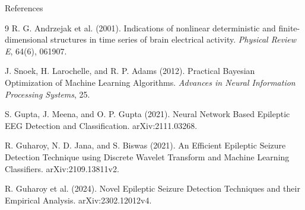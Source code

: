 \documentclass{beamer}
\begin{document}
\begin{frame}{References}
  \scriptsize
  \begin{thebibliography}{9}
    R. G. Andrzejak et al. (2001).
    \newblock Indications of nonlinear deterministic and finite-dimensional structures in time series of brain electrical activity.
    \newblock \emph{Physical Review E}, 64(6), 061907.

    J. Snoek, H. Larochelle, and R. P. Adams (2012).
    \newblock Practical Bayesian Optimization of Machine Learning Algorithms.
    \newblock \emph{Advances in Neural Information Processing Systems}, 25.

    S. Gupta, J. Meena, and O. P. Gupta (2021).
    \newblock Neural Network Based Epileptic EEG Detection and Classification.
    \newblock arXiv:2111.03268.

    R. Guharoy, N. D. Jana, and S. Biswas (2021).
    \newblock An Efficient Epileptic Seizure Detection Technique using Discrete Wavelet Transform and Machine Learning Classifiers.
    \newblock arXiv:2109.13811v2.

    R. Guharoy et al. (2024).
    \newblock Novel Epileptic Seizure Detection Techniques and their Empirical Analysis.
    \newblock arXiv:2302.12012v4.
  \end{thebibliography}
\end{frame}
\end{document}

